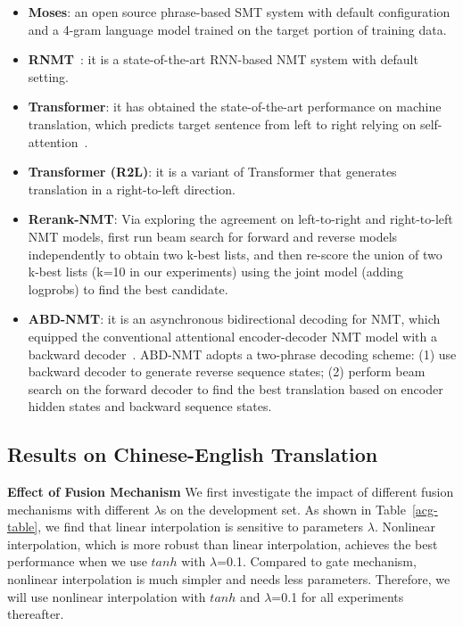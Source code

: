 \documentclass[11pt,a4paper]{article}
\begin{document}
\begin{CJK*}{UTF8}{gbsn}
\begin{itemize}
	\item \textbf{Moses}: an open source phrase-based SMT system with default configuration and a 4-gram language model trained on the target portion of training data.
	\item \textbf{RNMT}~\cite{Luong:2015A}: it is a  state-of-the-art RNN-based NMT system with default setting.
	\item \textbf{Transformer}: it has obtained the state-of-the-art performance on machine translation, which predicts target sentence from left to right relying on self-attention~\cite{vaswani2017attention}.
	\item \textbf{Transformer (R2L)}: it is a variant of Transformer that generates translation in a right-to-left direction.
	\item \textbf{Rerank-NMT}: Via exploring the agreement on left-to-right and right-to-left NMT models, \cite{liu2016agreementa,W16-2323} first run beam search for forward and reverse models independently to obtain two k-best lists, and then re-score the union of two k-best lists (k=10 in our experiments) using the joint model (adding logprobs) to find the best candidate.
\item \textbf{ABD-NMT}: it is an asynchronous bidirectional decoding for NMT, which equipped the conventional attentional encoder-decoder NMT model with a backward decoder~\cite{zhang2018asynchronous}.
	ABD-NMT adopts a two-phrase decoding scheme: (1) use backward decoder to generate reverse sequence states; (2) perform beam search on the forward decoder to find the best translation based on encoder hidden states and backward sequence states.
\end{itemize}


\subsection{Results on Chinese-English Translation}

\textbf{Effect of Fusion Mechanism}
We first investigate the impact of different fusion mechanisms with different $\lambda$s on the development set.
As shown in Table~\ref{acg-table}, we find that linear interpolation is sensitive to parameters $\lambda$.
Nonlinear interpolation, which is more robust than linear interpolation, achieves the best performance when we use $tanh$ with $\lambda$=0.1. Compared to gate mechanism, nonlinear interpolation is much simpler and needs less parameters. Therefore, we will use nonlinear interpolation with  $tanh$ and $\lambda$=0.1 for all experiments thereafter.



\end{CJK*}
\end{document}
